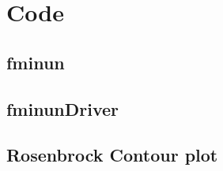 \documentclass[a4paper]{article}
\begin{document}
        \section{Code}
        \subsection{fminun}
        
        \subsection{fminunDriver}
        
        \newpage
        \subsection{Rosenbrock Contour plot}
        
\end{document}
